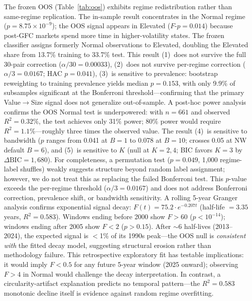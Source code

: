 \documentclass[sigconf,anonymous]{acmart}
\begin{document}
The frozen OOS (Table~\ref{tab:oos}) exhibits regime redistribution
rather than same-regime replication. The in-sample result concentrates
in the Normal regime ($p = 8.75 \times 10^{-9}$); the OOS signal
appears in Elevated ($F$-$p = 0.014$) because post-GFC markets spend
more time in higher-volatility states. The frozen classifier assigns
formerly Normal observations to Elevated, doubling the Elevated share
from 13.7\% training to 33.7\% test.
This result (1)~does not survive the full 30-pair correction ($\alpha/30 = 0.00033$),
(2)~does not survive per-regime correction ($\alpha/3 = 0.0167$; HAC $p = 0.041$),
(3)~is sensitive to prevalence: bootstrap reweighting to training
prevalence yields median $p = 0.153$, with only 9.9\% of subsamples
significant at the Bonferroni threshold---confirming that the primary
Value$\to$Size signal does not generalize out-of-sample.
A post-hoc power analysis confirms the OOS Normal test is underpowered:
with $n = 661$ and observed $R^2 = 0.32\%$, the test achieves only 31\% power;
80\% power would require $R^2 = 1.1\%$---roughly three times the observed value.
The result (4)~is sensitive to bandwidth ($p$ ranges from 0.041 at $B{=}1$ to
0.078 at $B{=}10$; crosses 0.05 at NW default $B{=}6$), and
(5)~is sensitive to $K$ (null at $K = 2, 4$; BIC favors $K = 3$ by
$\Delta\text{BIC} = 1{,}680$).
For completeness, a permutation test ($p = 0.049$, 1,000 regime-label
shuffles) weakly suggests structure beyond random label assignment;
however, we do not treat this as replacing the failed Bonferroni test.
This $p$-value exceeds the per-regime threshold ($\alpha/3 = 0.0167$)
and does not address Bonferroni correction, prevalence shift, or
bandwidth sensitivity.
A rolling 5-year Granger analysis confirms exponential signal decay:
$F(t) = 75.2 \cdot e^{-0.207t}$ (half-life $= 3.35$ years, $R^2 = 0.583$).
Windows ending before 2000 show $F > 60$ ($p < 10^{-14}$); windows
ending after 2005 show $F < 2$ ($p > 0.15$). After ${\sim}6$ half-lives
(2013--2024), the expected signal is $<$1\% of its 1990s peak---the OOS
null is \emph{consistent with} the fitted decay model, suggesting
structural erosion rather than methodology failure.
This retrospective exploratory fit has testable implications: it
would imply $F < 0.5$ for any future 5-year window (2025 onward);
observing $F > 4$ in Normal would challenge the decay interpretation.
In contrast, a circularity-artifact explanation predicts no temporal
pattern---the $R^2 = 0.583$ monotonic decline itself is evidence against
random regime overfitting.
\end{document}
